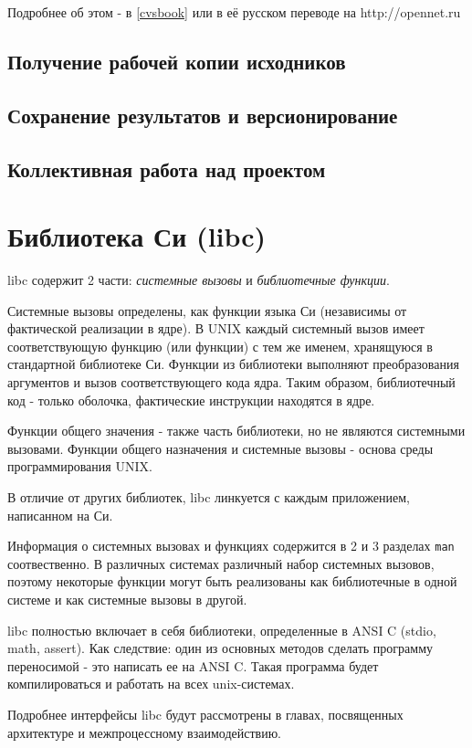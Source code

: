 Подробнее об этом - в \ref{cvsbook} или в её русском переводе на http://opennet.ru

\subsection{Получение рабочей копии исходников}


\subsection{Сохранение результатов и версионирование}

\subsection{Коллективная работа над проектом}



\section{Библиотека Си (libc)}

libc содержит 2 части: \emph{системные вызовы} и \emph{библиотечные функции}. 

Системные вызовы определены, как функции языка Си (независимы от фактической реализации в ядре). В UNIX каждый системный вызов имеет соответствующую функцию (или функции) с тем же именем, хранящуюся в стандартной библиотеке Си. Функции из библиотеки выполняют преобразования аргументов и вызов соответствующего кода ядра. Таким образом, библиотечный код - только оболочка, фактические инструкции находятся в ядре.

Функции общего значения - также часть библиотеки, но не являются системными вызовами. Функции общего назначения и системные вызовы - основа среды программирования UNIX.

В отличие от других библиотек, libc линкуется с каждым приложением, написанном на Си.

Информация о системных вызовах и функциях содержится в 2 и 3 разделах \verb+man+ соотвественно. В различных системах различный набор системных вызовов, поэтому некоторые функции могут быть реализованы как библиотечные в одной системе и как системные вызовы в другой. 

libc полностью включает в себя библиотеки, определенные в ANSI C (stdio, math, assert). Как следствие: один из основных методов сделать программу переносимой - это написать ее на ANSI C. Такая программа будет компилироваться и работать на всех unix-системах.

Подробнее интерфейсы libc будут рассмотрены в главах, посвященных архитектуре и межпроцессному взаимодействию.
